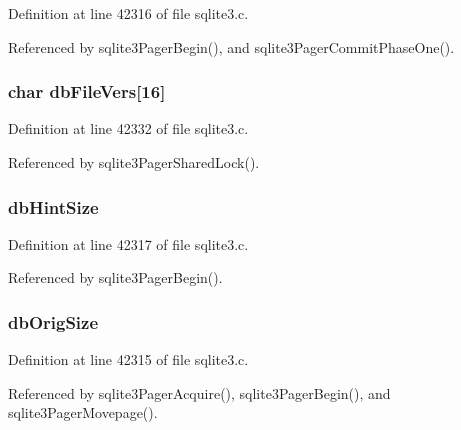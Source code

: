 Definition at line 42316 of file sqlite3.\+c.



Referenced by sqlite3\+Pager\+Begin(), and sqlite3\+Pager\+Commit\+Phase\+One().

\hypertarget{struct_pager_a836ab610e51a1921192ef051ddb4b3ac}{}
\subsubsection[{db\+File\+Vers}]{\setlength{\rightskip}{0pt plus 5cm}char db\+File\+Vers\mbox{[}16\mbox{]}}\label{struct_pager_a836ab610e51a1921192ef051ddb4b3ac}


Definition at line 42332 of file sqlite3.\+c.



Referenced by sqlite3\+Pager\+Shared\+Lock().

\hypertarget{struct_pager_a0ed011dd1d6e2bfe44fa54b146ff383d}{}
\subsubsection[{db\+Hint\+Size}]{ db\+Hint\+Size}\label{struct_pager_a0ed011dd1d6e2bfe44fa54b146ff383d}


Definition at line 42317 of file sqlite3.\+c.



Referenced by sqlite3\+Pager\+Begin().

\hypertarget{struct_pager_a3b00f18eeb5b83d35c372474fe4dee9d}{}
\subsubsection[{db\+Orig\+Size}]{ db\+Orig\+Size}\label{struct_pager_a3b00f18eeb5b83d35c372474fe4dee9d}


Definition at line 42315 of file sqlite3.\+c.



Referenced by sqlite3\+Pager\+Acquire(), sqlite3\+Pager\+Begin(), and sqlite3\+Pager\+Movepage().

\hypertarget{struct_pager_afbe0739765fdd93414fe2457f0685a84}{}
